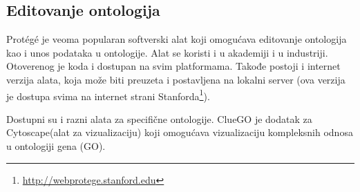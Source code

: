 \subsection{Editovanje ontologija}

Prot\'eg\'e je veoma popularan softverski alat koji omogućava editovanje ontologija kao i unos podataka u ontologije.
Alat se koristi i u akademiji i u industriji.
Otoverenog je koda i dostupan na svim platformama.
Takođe postoji i internet verzija alata, koja može biti preuzeta i postavljena na lokalni server 
(ova verzija je dostupa svima na internet strani Stanforda\footnote{\url{http://webprotege.stanford.edu}}). \par
Dostupni su i razni alata za specifične ontologije. ClueGO je dodatak za Cytoscape(alat za vizualizaciju)
 koji omogućava vizualizaciju kompleksnih odnosa u ontologiji gena (GO).
